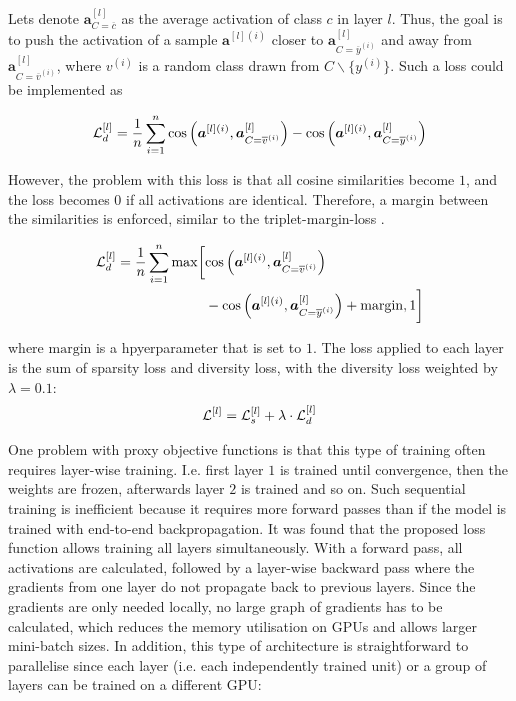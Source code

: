 Lets denote {\footnotesize $\boldsymbol{a}^{[l]}_{C=\overline{c}}$} as the average activation of class $c$ in layer $l$. Thus, the goal is to push the activation of a sample $\boldsymbol{a}^{[l](i)}$ closer to {\footnotesize $\boldsymbol{a}^{[l]}_{C=\overline{y}^{(i)}}$} and away from {\footnotesize $\boldsymbol{a}^{[l]}_{C=\overline{v}^{(i)}}$}, where $v^{(i)}$ is a random class drawn from $ C \backslash \{y^{(i)} \}$. Such a loss could be implemented as

\begin{align}\eqlbl{vso_8}
		\mathcal{L}^{[l]}_{d}  = \frac{1}{n} \sum_{i=1}^{n} \text{cos} \left(\boldsymbol{a}^{[l](i)}, \boldsymbol{a}^{[l]}_{C=\overline{v}^{(i)}} \right) - \text{cos} \left(\boldsymbol{a}^{[l](i)}, \boldsymbol{a}^{[l]}_{C=\overline{y}^{(i)}} \right)
\end{align}

However, the problem with this loss is that all cosine similarities become $1$, and the loss becomes $0$ if all activations are identical.
Therefore, a margin between the similarities is enforced, similar to the triplet-margin-loss  .


\begin{align}\eqlbl{vso_9}
\begin{split}
		\mathcal{L}^{[l]}_{d} = \frac{1}{n} \sum_{i=1}^{n} \max \biggl[ & \text{cos} \left(\boldsymbol{a}^{[l](i)}, \boldsymbol{a}^{[l]}_{C=\overline{v}^{(i)}} \right) \\
		& - \text{cos} \left(\boldsymbol{a}^{[l](i)}, \boldsymbol{a}^{[l]}_{C=\overline{y}^{(i)}} \right) + \text{margin}, 1 \biggr]
\end{split}
\end{align}

where $\text{margin}$ is a hpyerparameter that is set to $1$.
The loss applied to each layer is the sum of sparsity loss and diversity loss, with the diversity loss weighted by $\lambda=0.1$:
\begin{align}\eqlbl{vso_10}
		\mathcal{L}^{[l]} =\mathcal{L}^{[l]}_{s} + \lambda \cdot \mathcal{L}^{[l]}_{d}
\end{align}


One problem with proxy objective functions is that this type of training often requires layer-wise training. I.e. first layer $1$ is trained until convergence, then the weights are frozen, afterwards layer $2$ is trained and so on.
Such sequential training is inefficient because it requires more forward passes than if the model is trained with end-to-end backpropagation.
It was found that the proposed loss function allows training all layers simultaneously. With a forward pass, all activations are calculated, followed by a layer-wise backward pass where the gradients from one layer do not propagate back to previous layers.
Since the gradients are only needed locally, no large graph of gradients has to be calculated, which reduces the memory utilisation on GPUs and allows larger mini-batch sizes. In addition, this type of architecture is straightforward to parallelise since each layer (i.e. each independently trained unit) or a group of layers can be trained on a different GPU:

